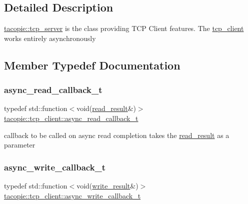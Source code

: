 \subsection{Detailed Description}
\hyperlink{classtacopie_1_1tcp__server}{tacopie\+::tcp\+\_\+server} is the class providing T\+CP Client features. The \hyperlink{classtacopie_1_1tcp__client}{tcp\+\_\+client} works entirely asynchronously 

\subsection{Member Typedef Documentation}
\mbox{\label{classtacopie_1_1tcp__client_acdf9dea8bac6c56f7b04ce38b9432322}} 
\subsubsection{\texorpdfstring{async\+\_\+read\+\_\+callback\+\_\+t}{async\_read\_callback\_t}}
{\footnotesize\ttfamily typedef std\+::function$<$void(\hyperlink{structtacopie_1_1tcp__client_1_1read__result}{read\+\_\+result}\&)$>$ \hyperlink{classtacopie_1_1tcp__client_acdf9dea8bac6c56f7b04ce38b9432322}{tacopie\+::tcp\+\_\+client\+::async\+\_\+read\+\_\+callback\+\_\+t}}

callback to be called on async read completion takes the \hyperlink{structtacopie_1_1tcp__client_1_1read__result}{read\+\_\+result} as a parameter \mbox{\label{classtacopie_1_1tcp__client_ad48b8c8dff8a77490eb2e3e802c82b97}} 
\subsubsection{\texorpdfstring{async\+\_\+write\+\_\+callback\+\_\+t}{async\_write\_callback\_t}}
{\footnotesize\ttfamily typedef std\+::function$<$void(\hyperlink{structtacopie_1_1tcp__client_1_1write__result}{write\+\_\+result}\&)$>$ \hyperlink{classtacopie_1_1tcp__client_ad48b8c8dff8a77490eb2e3e802c82b97}{tacopie\+::tcp\+\_\+client\+::async\+\_\+write\+\_\+callback\+\_\+t}}

